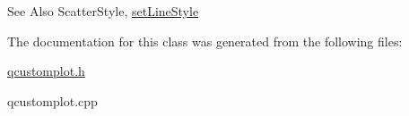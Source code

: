 \begin{DoxySeeAlso}{See Also}
Scatter\-Style, \hyperlink{classQCPGraph_a513fecccff5b2a50ce53f665338c60ff}{set\-Line\-Style} 
\end{DoxySeeAlso}


The documentation for this class was generated from the following files\-:\begin{DoxyCompactItemize}
\item 
\hyperlink{qcustomplot_8h}{qcustomplot.\-h}\item 
qcustomplot.\-cpp\end{DoxyCompactItemize}
